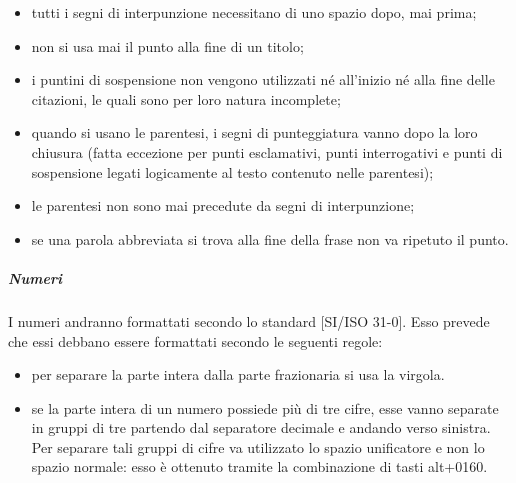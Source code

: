 					\begin{itemize}
						\item tutti i segni di interpunzione necessitano di uno spazio dopo, mai prima;
						\item non si usa mai il punto alla fine di un titolo;
						\item i puntini di sospensione non vengono utilizzati né all’inizio né alla fine delle citazioni, le quali sono per loro natura incomplete;
						\item quando si usano le parentesi, i segni di punteggiatura vanno dopo la loro chiusura (fatta eccezione per punti esclamativi, punti interrogativi e punti di sospensione legati logicamente al testo contenuto nelle parentesi);
						\item le parentesi non sono mai precedute da segni di interpunzione;
						\item se una parola abbreviata si trova alla fine della frase non va ripetuto il punto.
					\end{itemize}
				\subparagraph{Numeri}
					I numeri andranno formattati secondo lo standard [SI/ISO 31-0]. Esso prevede che essi debbano essere formattati secondo le seguenti regole:
					\begin{itemize}
						\item per separare la parte intera dalla parte frazionaria si usa la virgola.
						\item se la parte intera di un numero possiede più di tre cifre, esse vanno separate in gruppi di tre partendo dal separatore decimale e andando verso sinistra. Per separare tali gruppi di cifre va utilizzato lo spazio unificatore e non lo spazio normale: esso è ottenuto tramite la combinazione di tasti alt+0160.
					\end{itemize}
